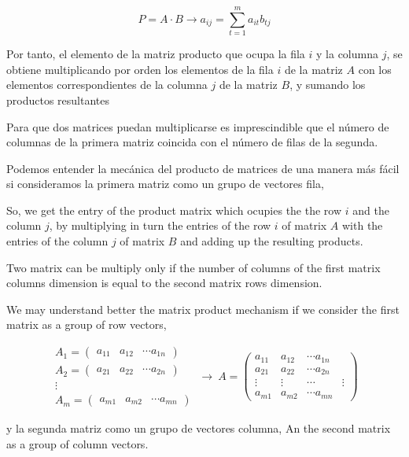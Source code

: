 \begin{equation*}
P=A\cdot B \rightarrow a_{ij}=\sum_{t=1}^m a_{it}b_{tj}
\end{equation*}
\begin{paracol}{2}
Por tanto, el elemento de la matriz producto que ocupa la fila $i$ y la columna $j$, se obtiene multiplicando por orden los elementos de la fila $i$ de la matriz $A$ con los elementos correspondientes de la columna $j$ de la matriz $B$, y sumando los productos resultantes

Para que dos matrices puedan multiplicarse es imprescindible que el número de columnas de la primera matriz coincida con el número de filas de la segunda.

Podemos entender la mecánica del producto de matrices de una manera más fácil si consideramos  la primera matriz como un grupo de vectores fila,

\switchcolumn
So, we get the entry of the product matrix which ocupies the the row $i$ and the column $j$, by multiplying in turn the entries of the row $i$ of matrix $A$ with the entries of the column $j$ of matrix $B$ and adding up the resulting products. 

Two matrix can be multiply only if the number of columns of the first matrix columns dimension is equal to the second matrix rows dimension.

We may understand better the matrix product mechanism if we consider the first matrix as a group of row vectors,  
\end{paracol}

\begin{equation*}
\begin{aligned}
A_1=\begin{pmatrix}
a_{11}& a_{12}& \cdots a_{1n}
\end{pmatrix}\\
A_2=\begin{pmatrix}
a_{21}& a_{22}& \cdots a_{2n}
\end{pmatrix}\\
\vdots \  \ \   \  \  \  \ \ \ \ \\
A_m=\begin{pmatrix}
a_{m1}& a_{m2}& \cdots a_{mn}
\end{pmatrix}
\end{aligned} \ \rightarrow \ 
A=\begin{pmatrix}
a_{11}& a_{12}& \cdots a_{1n}\\
a_{21}& a_{22}& \cdots a_{2n}\\
\vdots& \vdots& \cdots& \vdots \\
a_{m1}& a_{m2}& \cdots a_{mn}
\end{pmatrix}
\end{equation*}
\begin{paracol}{2}
y la segunda matriz como un grupo de vectores columna,
\switchcolumn
An the second matrix as a group of column vectors.  
\end{paracol}

